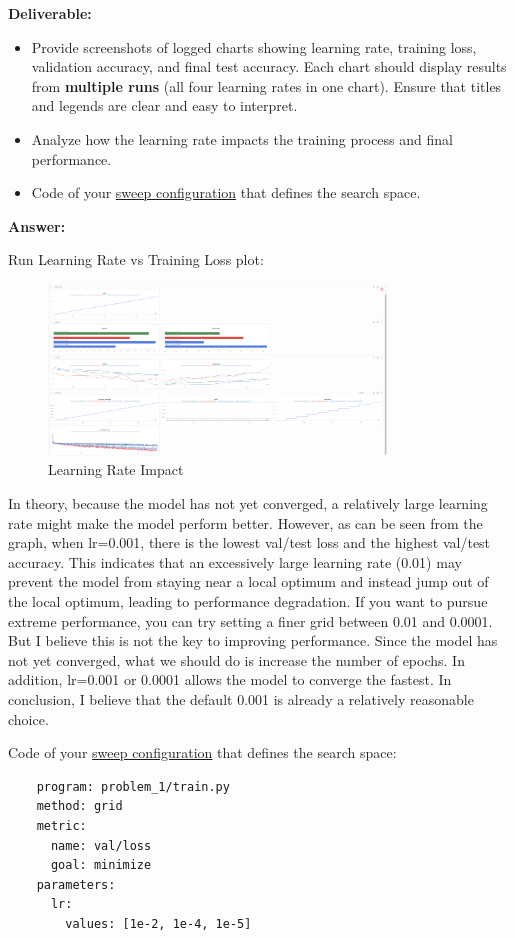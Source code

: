 \documentclass[11pt, oneside]{article}   	%
\begin{document}
\noindent\textbf{Deliverable:}
\begin{itemize}
    \item Provide screenshots of logged charts showing learning rate, training loss, validation accuracy, and final test accuracy. Each chart should display results from \textbf{multiple runs} (all four learning rates in one chart). Ensure that titles and legends are clear and easy to interpret.
    \item Analyze how the learning rate impacts the training process and final performance.
    \item Code of your \href{https://docs.wandb.ai/guides/sweeps/define-sweep-configuration}{sweep configuration} that defines the search space.
\end{itemize}

\begin{answerbox} \textbf{Answer:} \vspace*{1cm}

Run Learning Rate vs Training Loss plot:

\begin{figure}[h]
    \centering
    \includegraphics[width=0.8\textwidth]{images/lr.png}
    \caption{Learning Rate Impact}
\end{figure}

In theory, because the model has not yet converged, a relatively large learning rate might make the model perform better. However, as can be seen from the graph, when lr=0.001, there is the lowest val/test loss and the highest val/test accuracy. This indicates that an excessively large learning rate (0.01) may prevent the model from staying near a local optimum and instead jump out of the local optimum, leading to performance degradation. If you want to pursue extreme performance, you can try setting a finer grid between 0.01 and 0.0001. But I believe this is not the key to improving performance. Since the model has not yet converged, what we should do is increase the number of epochs. In addition, lr=0.001 or 0.0001 allows the model to converge the fastest. In conclusion, I believe that the default 0.001 is already a relatively reasonable choice.

Code of your \href{https://docs.wandb.ai/guides/sweeps/define-sweep-configuration}{sweep configuration} that defines the search space:

\begin{verbatim}
    program: problem_1/train.py
    method: grid 
    metric:
      name: val/loss
      goal: minimize
    parameters:
      lr:
        values: [1e-2, 1e-4, 1e-5]
\end{verbatim}

\end{answerbox}
\end{document}
